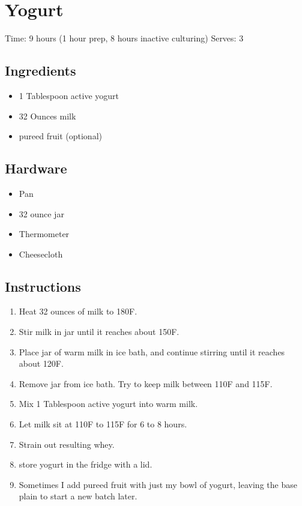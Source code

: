 \section{Yogurt}
\label{yogurt}
\setcounter{secnumdepth}{0}
Time: 9 hours (1 hour prep, 8 hours inactive culturing)
Serves: 3

\begin{multicols}{2}
\subsection*{Ingredients}
\begin{itemize}
    \item 1 Tablespoon active yogurt
    \item 32 Ounces milk
    \item pureed fruit (optional)
\end{itemize}

\subsection*{Hardware}
\begin{itemize}
    \item Pan
    \item 32 ounce jar
    \item Thermometer
    \item Cheesecloth
\end{itemize}
\clearpage

\subsection*{Instructions}
\begin{enumerate}
    \item Heat 32 ounces of milk to 180F.
    \item Stir milk in jar until it reaches about 150F.
    \item Place jar of warm milk in ice bath, and continue stirring until it reaches about 120F.
    \item Remove jar from ice bath. Try to keep milk between 110F and 115F.
    \item Mix 1 Tablespoon active yogurt into warm milk.
    \item Let milk sit at 110F to 115F for 6 to 8 hours.
    \item Strain out resulting whey.
    \item store yogurt in the fridge with a lid.
    \item Sometimes I add pureed fruit with just my bowl of yogurt, leaving the base plain to start a new batch later.
\end{enumerate}


\end{multicols}
